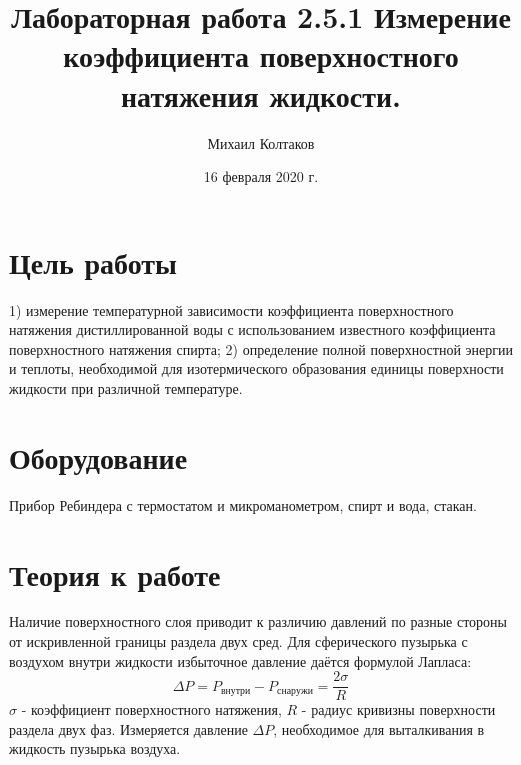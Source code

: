 \documentclass[a4paper, 12pt]{article}
\title{Лабораторная работа 2.5.1 Измерение коэффициента поверхностного натяжения жидкости.}
\author{Михаил Колтаков}
\date{16 февраля 2020 г.}
\begin{document}
	\maketitle
	\section*{Цель работы}
		1) измерение температурной зависимости  коэффициента поверхностного натяжения дистиллированной воды с использованием известного коэффициента поверхностного натяжения спирта;  2) определение полной поверхностной энергии  и теплоты, необходимой для изотермического образования единицы  поверхности жидкости  при различной температуре.
	\section*{Оборудование}
		Прибор Ребиндера с термостатом и микроманометром, спирт и вода, стакан.
	\section*{Теория к работе}
		Наличие поверхностного слоя приводит к различию давлений по разные стороны от искривленной границы раздела двух сред.  Для сферического пузырька с воздухом  внутри жидкости избыточное давление даётся формулой Лапласа: 
		$$\Delta P = P_{внутри} - P_{снаружи} = \frac{2 \sigma}{R}$$
		$\sigma$ - коэффициент поверхностного натяжения, $R$ - радиус кривизны поверхности раздела двух фаз. Измеряется давление $\Delta P$, необходимое для выталкивания в жидкость пузырька воздуха. 
\end{document}
